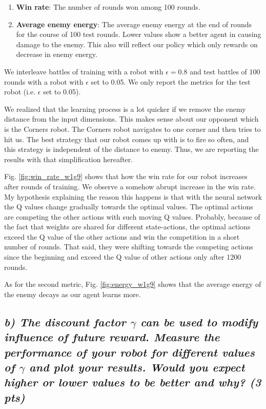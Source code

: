 \documentclass[a4paper,12pt]{article}
\begin{document}
\begin{enumerate}
\item \textbf{Win rate}: The number of rounds won among 100 rounds. 
\item \textbf{Average enemy energy}: The average enemy energy at the end of rounds for the course of 100 test rounds. Lower values show a better agent in causing damage to the enemy. This also will reflect our policy which only rewards on decrease in enemy energy. 

\end{enumerate}

We interleave battles of training with a robot with $\epsilon = 0.8$ and test battles of 100 rounds with a robot with $\epsilon$ set to 0.05. We only report the metrics for the test robot (i.e. $\epsilon$ set to 0.05). 

We realized that the learning process is a lot quicker if we remove the enemy distance from the input dimensions. This makes sense about our opponent which is the Corners robot. The Corners robot navigates to one corner and then tries to hit us. The best strategy that our robot comes up with is to fire so often, and this strategy is independent of the distance to enemy. Thus, we are reporting the results with that simplification hereafter. 


Fig. \ref{fig:win_rate_w1g9} shows that how the win rate for our robot increases after rounds of training. We observe a somehow abrupt  increase in the win rate. My hypothesis explaining the reason this happens is that with the neural network the Q values change gradually towards the optimal values. The optimal actions are competing the other actions with such moving Q values. Probably, because of the fact that weights are shared for different state-actions, the optimal actions exceed the Q value of the other actions and win the competition in a short number of rounds. That said, they were shifting towards the competing actions since the beginning and exceed the Q value of other actions only after 1200 rounds. 

As for the second metric, Fig. \ref{fig:energy_w1g9} shows that the average energy of the enemy decays as our agent learns more. 

\pagebreak

\subsection*{\emph{b) The discount factor $\gamma$ can be used to modify influence of future reward. Measure the performance of your robot for different values of $\gamma$ and plot your results. Would you expect higher or lower values to be better and why? (3 pts)}}
\end{document}
